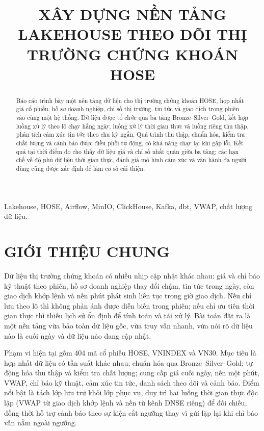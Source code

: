 \documentclass[conference,a4paper]{IEEEtran}
\title{XÂY DỰNG NỀN TẢNG LAKEHOUSE
THEO DÕI THỊ TRƯỜNG CHỨNG KHOÁN HOSE}
\author{
\IEEEauthorblockN{\authorname, \mentorname\textsuperscript{1}}
\IEEEauthorblockA{\textsuperscript{1}\mentorunit\\
Email: \mentoremail}
}
\begin{document}
\maketitle
\raggedbottom

\begin{abstract}
Báo cáo trình bày một nền tảng dữ liệu cho thị trường chứng khoán HOSE, hợp nhất giá cổ phiếu, hồ sơ doanh nghiệp, chỉ số thị trường, tin tức và giao dịch trong phiên vào cùng một hệ thống. Dữ liệu được tổ chức qua ba tầng Bronze--Silver--Gold, kết hợp luồng xử lý theo lô chạy hằng ngày, luồng xử lý thời gian thực và luồng riêng thu thập, phân tích cảm xúc tin tức theo chu kỳ ngắn. Quá trình thu thập, chuẩn hóa, kiểm tra chất lượng và cảnh báo được điều phối tự động, có khả năng chạy lại khi gặp lỗi. Kết quả tại thời điểm đo cho thấy dữ liệu giá và chỉ số nhất quán giữa ba tầng; các hạn chế về độ phủ dữ liệu thời gian thực, đánh giá mô hình cảm xúc và vận hành đa người dùng cũng được xác định để làm cơ sở cải thiện.
\end{abstract}


\begin{IEEEkeywords}
Lakehouse, HOSE, Airflow, MinIO, ClickHouse, Kafka, dbt, VWAP, chất lượng dữ liệu.
\end{IEEEkeywords}

\section{GIỚI THIỆU CHUNG}

Dữ liệu thị trường chứng khoán có nhiều nhịp cập nhật khác nhau: giá và chỉ báo kỹ thuật theo phiên, hồ sơ doanh nghiệp thay đổi chậm, tin tức trong ngày, còn giao dịch khớp lệnh và nến phút phát sinh liên tục trong giờ giao dịch. Nếu chỉ lưu theo lô thì không phản ánh được diễn biến trong phiên; nếu chỉ ưu tiên thời gian thực thì thiếu lịch sử ổn định để tính toán và tái xử lý. Bài toán đặt ra là một nền tảng vừa bảo toàn dữ liệu gốc, vừa truy vấn nhanh, vừa nói rõ dữ liệu nào là cuối ngày và dữ liệu nào đang cập nhật.

Phạm vi hiện tại gồm 404 mã cổ phiếu HOSE, VNINDEX và VN30. Mục tiêu là hợp nhất dữ liệu có tần suất khác nhau; chuẩn hóa qua Bronze--Silver--Gold; tự động hóa thu thập và kiểm tra chất lượng; cung cấp giá cuối ngày, nến một phút, VWAP, chỉ báo kỹ thuật, cảm xúc tin tức, danh sách theo dõi và cảnh báo. Điểm nổi bật là tách lớp lưu trữ khỏi lớp phục vụ, duy trì hai luồng thời gian thực độc lập (VWAP từ giao dịch khớp lệnh và nến từ kênh DNSE riêng) để đối chiếu, đồng thời hỗ trợ cảnh báo theo sự kiện cắt ngưỡng thay vì gửi lặp lại khi chỉ báo vẫn nằm ngoài ngưỡng.
\end{document}
